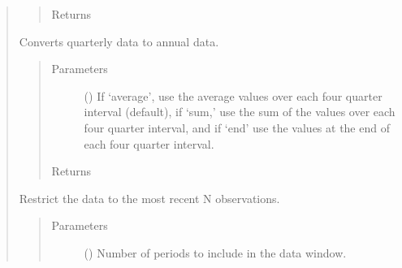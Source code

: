 \documentclass[letterpaper,10pt,openany,oneside,english]{sphinxmanual}
\begin{document}
\begin{fulllineitems}
\begin{quote}
\begin{fulllineitems}
\begin{quote}
\begin{description}
\item[{Returns}] \leavevmode
{\hyperref[\detokenize{series_class:fredpy.series}]{}}

\end{description}\end{quote}

\end{fulllineitems}


\begin{fulllineitems}
\label{\detokenize{series_class:fredpy.series.quartertoannual}}
Converts quarterly data to annual data.
\begin{quote}\begin{description}
\item[{Parameters}] \leavevmode
{} () \textendash{} If ‘average’, use the average values over each four quarter interval (default), if ‘sum,’ use the sum of the values over each four quarter interval, and if ‘end’ use the values at the end of each four quarter interval.

\item[{Returns}] \leavevmode
{\hyperref[\detokenize{series_class:fredpy.series}]{}}

\end{description}\end{quote}

\end{fulllineitems}


\begin{fulllineitems}
\label{\detokenize{series_class:fredpy.series.recent}}
Restrict the data to the most recent N observations.
\begin{quote}\begin{description}
\item[{Parameters}] \leavevmode
{} () \textendash{} Number of periods to include in the data window.


\end{description}
\end{quote}
\end{fulllineitems}
\end{quote}
\end{fulllineitems}
\end{document}
